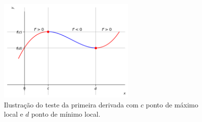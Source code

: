 \cleardoublepage\documentclass[../main.tex]{subfiles}
\begin{document}
\begin{figure}[H]
  \centering
  \includegraphics[width=0.6\textwidth]{./fig_apl_deriv/fig_tder1}
  \caption{Ilustração do teste da primeira derivada com $c$ ponto de máximo local e $d$ ponto de mínimo local.}
  \label{fig:tder1}
\end{figure}
\end{document}
